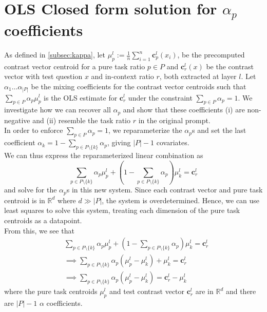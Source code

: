 \documentclass[11pt]{article}
\begin{document}
\section{OLS Closed form solution for \texorpdfstring{$\alpha_p$}{alpha p} coefficients}
\label{appendix:ols_sol}
As defined in \ref{subsec:kappa}, let \(\mu_p^l := \frac{1}{n} \sum_{i = 1}^n \textbf{c}_p^l (x_i)\), be the precomputed contrast vector centroid for a pure task ratio \(p \in P\) and \(\textbf{c}_r^l(x)\) be the contrast vector with test question \(x\) and in-context ratio \(r\), both extracted at layer \(l\). Let \(\alpha_1 \ldots \alpha_{|P|}\) be the mixing coefficients for the contrast vector centroids such that \(\sum_{p \in P} \alpha_p \mu_p^l\) is the OLS estimate for \(\textbf{c}_r^l\) under the constraint \(\sum_{p \in P} \alpha_p = 1\). We investigate how we can recover all \(\alpha_p\) and show that these coefficients (i) are non-negative and (ii) resemble the task ratio \(r\) in the original prompt. \\[1em]
In order to enforce \(\sum_{p \in P} \alpha_p = 1\), we reparameterize the \(\alpha_p\)s and set the last coefficient \(\alpha_{k} = 1 - \sum_{p \in P \setminus \{k\}} \alpha_p\), giving \(|P| - 1\) covariates. \\[1em]
We can thus express the reparameterized linear combination as 
$$
    \sum_{p \in P \setminus \{k\}} \alpha_p \mu_p^l + \left(1 -  \sum_{p \in P \setminus \{k\}}\alpha_p\right) \mu_k^l = \textbf{c}_r^l
$$
and solve for the \(\alpha_p\)s in this new system. Since each contrast vector and pure task centroid is in \(\mathbb{R}^d\) where \(d \gg |P|\), the system is overdetermined. Hence, we can use least squares to solve this system, treating each dimension of the pure task centroids as a datapoint. \\[1em]
From this, we see that
\begin{align*}
    &\sum_{p \in P \setminus \{k\}} \alpha_p \mu_p^l + \left(1 -  \sum_{p \in P \setminus \{k\}}\alpha_p\right) \mu_k^l = \textbf{c}_r^l \\[1em]
    &\implies \sum_{p \in P \setminus \{k\}} \alpha_p  (\mu_p^l - \mu_k^l) + \mu_k^l = \textbf{c}_r^l \\[1em]
    &\implies \sum_{p \in P \setminus \{k\}} \alpha_p  (\mu_p^l - \mu_k^l) = \textbf{c}_r^l - \mu_k^l 
\end{align*}
where the pure task centroids \(\mu_p^l\) and test contrast vector \(\textbf{c}_r^l\) are in \(\mathbb{R}^d\) and there are \(|P| - 1\) \(\alpha\) coefficients. \\[1em]
\end{document}
